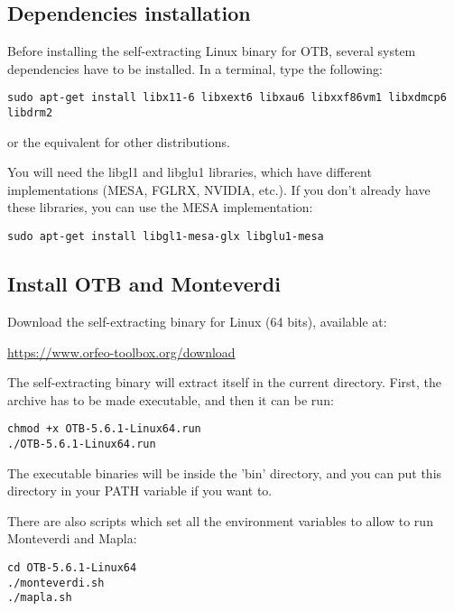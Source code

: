 \documentclass[10pt,a4paper]{article}
\begin{document}
\subsection{Dependencies installation}
Before installing the self-extracting Linux binary for OTB, several system dependencies have to be installed. In a terminal, type the following:
\begin{verbatim}
sudo apt-get install libx11-6 libxext6 libxau6 libxxf86vm1 libxdmcp6 libdrm2
\end{verbatim}
or the equivalent for other distributions.

You will need the libgl1 and libglu1 libraries, which have different implementations (MESA, FGLRX, NVIDIA, etc.). If you don't already have these libraries, you can use the MESA implementation:
\begin{verbatim}
sudo apt-get install libgl1-mesa-glx libglu1-mesa
\end{verbatim}

\subsection{Install OTB and Monteverdi}
Download the self-extracting binary for Linux (64 bits), available at:
\begin{center}
\url{https://www.orfeo-toolbox.org/download}
\end{center}

The self-extracting binary will extract itself in the current directory. First, the archive has to be made executable, and then it can be run:
\begin{verbatim}
chmod +x OTB-5.6.1-Linux64.run
./OTB-5.6.1-Linux64.run
\end{verbatim}

The executable binaries will be inside the 'bin' directory, and you can put this directory in your PATH variable if you want to. 

There are also scripts which set all the environment variables to allow to run Monteverdi and Mapla:
\begin{verbatim}
cd OTB-5.6.1-Linux64
./monteverdi.sh
./mapla.sh
\end{verbatim}
\end{document}

